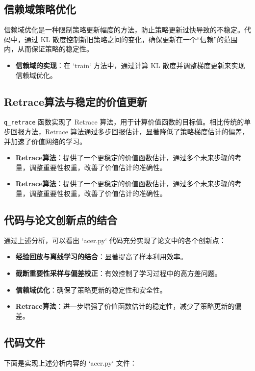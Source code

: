 \documentclass[twocolumn, 10pt]{article} %
\theoremstyle{remark}
\begin{document}
\subsection{信赖域策略优化}

信赖域优化是一种限制策略更新幅度的方法，防止策略更新过快导致的不稳定。代码中，通过 KL 散度控制新旧策略之间的变化，确保更新在一个“信赖”的范围内，从而保证策略的稳定性。

\begin{itemize}
    \item \textbf{信赖域的实现}：在 `train` 方法中，通过计算 KL 散度并调整梯度更新来实现信赖域优化。
\end{itemize}

\subsection{Retrace算法与稳定的价值更新}

\texttt{q\_retrace} 函数实现了 Retrace 算法，用于计算价值函数的目标值。相比传统的单步回报方法，Retrace 算法通过多步回报估计，显著降低了策略梯度估计的偏差，并加速了价值网络的学习。

\begin{itemize}
    \item \textbf{Retrace算法}：提供了一个更稳定的价值函数估计，通过多个未来步骤的考量，调整重要性权重，改善了价值估计的准确性。
\end{itemize}


\begin{itemize}
    \item \textbf{Retrace算法}：提供了一个更稳定的价值函数估计，通过多个未来步骤的考量，调整重要性权重，改善了价值估计的准确性。
\end{itemize}

\subsection{代码与论文创新点的结合}

通过上述分析，可以看出 `acer.py` 代码充分实现了论文中的各个创新点：
\begin{itemize}
    \item \textbf{经验回放与离线学习的结合}：显著提高了样本利用效率。
    \item \textbf{截断重要性采样与偏差校正}：有效控制了学习过程中的高方差问题。
    \item \textbf{信赖域优化}：确保了策略更新的稳定性和安全性。
    \item \textbf{Retrace算法}：进一步增强了价值函数估计的稳定性，减少了策略更新的偏差。
\end{itemize}

\subsection{代码文件}

下面是实现上述分析内容的 `acer.py` 文件：


\end{document}
